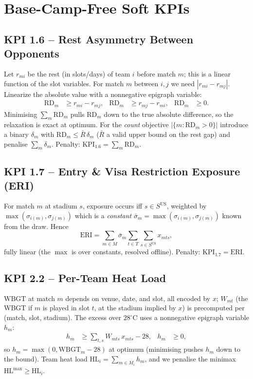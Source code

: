 \documentclass[12pt, letterpaper]{article}
\begin{document}
\section{Base-Camp-Free Soft KPIs}
\label{sec:free-kpi}

\subsection{KPI 1.6 -- Rest Asymmetry Between Opponents}
Let $r_{mi}$ be the rest (in slots/days) of team $i$ before match $m$;
this is a linear function of the slot variables. For match $m$ between
$i,j$ we need $|r_{mi}-r_{mj}|$. Linearize the absolute value with a
nonnegative epigraph variable:
\begin{align}
\mathrm{RD}_m &\ge r_{mi}-r_{mj}, &
\mathrm{RD}_m &\ge r_{mj}-r_{mi}, &
\mathrm{RD}_m&\ge 0.
\end{align}
Minimising $\sum_m\mathrm{RD}_m$ pulls $\mathrm{RD}_m$ down to the true
absolute difference, so the relaxation is exact at optimum. For the
\emph{count} objective $|\{m:\mathrm{RD}_m>0\}|$ introduce a binary
$\delta_m$ with $\mathrm{RD}_m\le \bar R\,\delta_m$ ($\bar R$ a valid
upper bound on the rest gap) and penalise $\sum_m\delta_m$. Penalty:
$\mathrm{KPI}_{1.6}=\sum_m \mathrm{RD}_m$.

\subsection{KPI 1.7 -- Entry \& Visa Restriction Exposure (ERI)}
For match $m$ at stadium $s$, exposure occurs iff $s\in S^{\mathrm{US}}$,
weighted by $\max(\sigma_{i(m)},\sigma_{j(m)})$ which is a \emph{constant}
$\bar\sigma_m=\max(\sigma_{i(m)},\sigma_{j(m)})$ known from the draw.
Hence
\begin{equation}
\mathrm{ERI}=\sum_{m\in M}\bar\sigma_m
  \sum_{t\in T}\sum_{s\in S^{\mathrm{US}}} x_{mts},
\end{equation}
fully linear (the $\max$ is over constants, resolved offline). Penalty:
$\mathrm{KPI}_{1.7}=\mathrm{ERI}$.

\subsection{KPI 2.2 -- Per-Team Heat Load}
$\mathrm{WBGT}$ at match $m$ depends on venue, date, and slot, all encoded
by $x$; $W_{mt}$ (the WBGT if $m$ is played in slot $t$, at the stadium
implied by $x$) is precomputed per (match, slot, stadium). The excess
over $28^\circ$C uses a nonnegative epigraph variable $h_m$:
\begin{align}
h_m &\ge \sum_{t,s} W_{mts}\,x_{mts} - 28, & h_m &\ge 0,
\end{align}
so $h_m=\max(0,\mathrm{WBGT}_m-28)$ at optimum (minimising pushes $h_m$
down to the bound). Team heat load $\mathrm{HL}_i=\sum_{m\in M_i} h_m$,
and we penalise the minimax $\mathrm{HL}^{\max}\ge\mathrm{HL}_i$.
\end{document}
